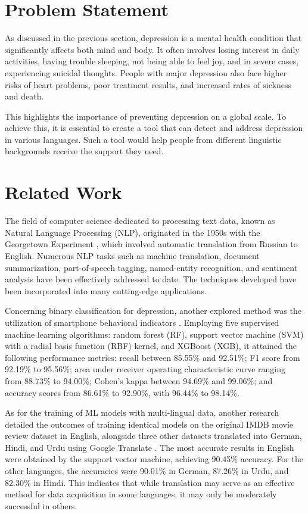 \section{Problem Statement}
\quad As discussed in the previous section, depression is a mental health condition that significantly affects both mind and body. It often involves losing interest in daily activities, having trouble sleeping, not being able to feel joy, and in severe cases, experiencing suicidal thoughts. People with major depression also face higher risks of heart problems, poor treatment results, and increased rates of sickness and death.

This highlights the importance of preventing depression on a global scale. To achieve this, it is essential to create a tool that can detect and address depression in various languages. Such a tool would help people from different linguistic backgrounds receive the support they need.


\section{Related Work}

\quad The field of computer science dedicated to processing text data, known as Natural Language Processing (NLP), originated in the 1950s with the Georgetown Experiment \cite{hutchins2004georgetown}, which involved automatic translation from Russian to English. Numerous NLP tasks such as machine translation, document summarization, part-of-speech tagging, named-entity recognition, and sentiment analysis have been effectively addressed to date. The techniques developed have been incorporated into many cutting-edge applications. 

Concerning binary classification for depression, another explored method was the utilization of smartphone behavioral indicators \cite{opoku2021predicting}. Employing five supervised machine learning algorithms: random forest (RF), support vector machine (SVM) with a radial basis function (RBF) kernel, and XGBoost (XGB), it attained the following performance metrics: recall between 85.55\% and 92.51\%; F1 score from 92.19\% to 95.56\%; area under receiver operating characteristic curve ranging from 88.73\% to 94.00\%; Cohen's kappa between 94.69\% and 99.06\%; and accuracy scores from 86.61\% to 92.90\%, with 96.44\% to 98.14\%.

As for the training of ML models with multi-lingual data, another research detailed the outcomes of training identical models on the original IMDB movie review dataset in English, alongside three other datasets translated into German, Hindi, and Urdu using Google Translate \cite{ghafoor2021impact}. The most accurate results in English were obtained by the support vector machine, achieving 90.45\% accuracy. For the other languages, the accuracies were 90.01\% in German, 87.26\% in Urdu, and 82.30\% in Hindi. This indicates that while translation may serve as an effective method for data acquisition in some languages, it may only be moderately successful in others.


